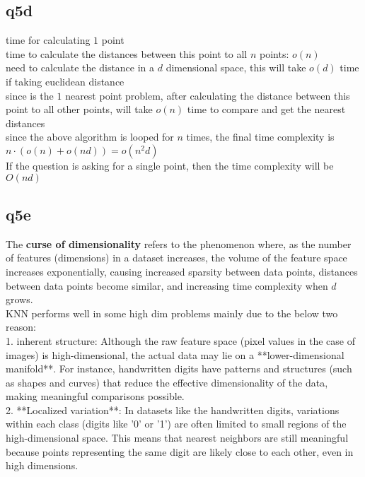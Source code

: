 \documentclass[12pt]{article}
\begin{document}
\newpage
\subsection{q5d}
\begin{tcolorbox}[myblock, title = answer]
  time for calculating $1$ point \\
  time to calculate the distances between this point to all $n$ points: $o(n)$ \\
  need to calculate the distance in a $d$ dimensional space, this will take $o(d)$ time if taking euclidean distance\\
  since is the $1$ nearest point problem, after calculating the distance between this point to all other points, will take $o(n)$ time to compare and get the nearest distances\\
  
  since the above algorithm is looped for $n$ times, the final time complexity is $n \cdot (o(n) + o(nd)) = o(n^{2}d)$ \\
  If the question is asking for a single point, then the time complexity will be \(O(nd)\)
\end{tcolorbox}

\newpage
\subsection{q5e}
\begin{tcolorbox}[myblock, title = answer]
  The \textbf{curse of dimensionality} refers to the phenomenon where, as the number of features (dimensions) in a dataset increases, the volume of the feature space increases exponentially, causing increased sparsity between data points, distances between data points become similar, and increasing time complexity when $d$ grows.\\

  KNN performs well in some high dim problems mainly due to the below two reason:\\
  1. inherent structure: Although the raw feature space (pixel values in the case of images) is high-dimensional, the actual data may lie on a **lower-dimensional manifold**. For instance, handwritten digits have patterns and structures (such as shapes and curves) that reduce the effective dimensionality of the data, making meaningful comparisons possible.\\
  2. **Localized variation**: In datasets like the handwritten digits, variations within each class (digits like '0' or '1') are often limited to small regions of the high-dimensional space. This means that nearest neighbors are still meaningful because points representing the same digit are likely close to each other, even in high dimensions.\\
\end{tcolorbox}
\end{document}
